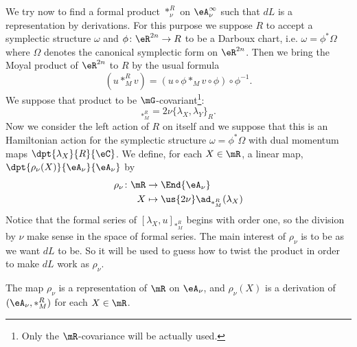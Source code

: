 We try now to find a formal product $\ast_{\nu}^R$ on $\eA_{\nu}^{\infty}$ such that $dL$ is a representation by derivations. For this purpose we suppose $R$ to accept a symplectic structure $\omega$ and $\phi\colon \eR^{2n}\to R$ to be a Darboux chart, i.e. $\omega=\phi^*\Omega$ where $\Omega$ denotes the canonical symplectic form on $\eR^{2n}$. Then we bring the Moyal product of $\eR^{2n}$ to $R$ by the usual formula
\begin{equation}
	(u\ast_M^R v)=(u\circ\phi\ast_M v\circ\phi)\circ\phi^{-1}.
\end{equation}
We suppose that product to be $\mG$-covariant\footnote{Only the $\mR$-covariance will be actually used.}:
\begin{equation}
	[\lambda_X,\lambda_Y]_{\ast_M^R}=2\nu \{ \lambda_X,\lambda_Y \}_R.
\end{equation}
Now we consider the left action of $R$ on itself and we suppose that this is an Hamiltonian action for the symplectic structure $\omega=\phi^*\Omega$ with dual momentum maps $\dpt{\lambda_X}{R}{\eC}$. We define, for each $X\in\mR$, a linear map, $\dpt{\rho_{\nu}(X)}{\eA_{\nu}}{\eA_{\nu}}$ by
\begin{equation}
	\begin{aligned}
		\rho_{\nu}\colon \mR & \to \End{\eA_{\nu}}                       \\
		X                    & \mapsto\us{2\nu}\ad_{\ast_M^R}(\lambda_X)
	\end{aligned}
\end{equation}
Notice that the formal series of $[\lambda_X,u]_{\ast_M^R}$ begins with order one, so the division by $\nu$ make sense in the space of formal series.  The main interest of $\rho_{\nu}$ is to be as we want $dL$ to be. So it will be used to guess how to twist the product in order to make $dL$ work as $\rho_{\nu}$.

\begin{proposition}
	The map $\rho_{\nu}$ is a representation of $\mR$ on $\eA_{\nu}$, and $\rho_{\nu}(X)$ is a derivation of $(\eA_{\nu},\ast_M^R)$ for each $X\in\mR$.
	\label{Proprhonureprez}
\end{proposition}

